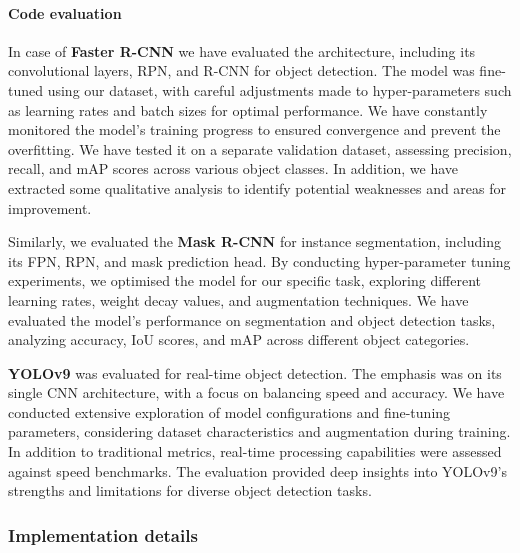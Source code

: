 \documentclass{IEEEtran}
\begin{document}
	\paragraph{Code evaluation}
	In case of  \textbf{Faster R-CNN} we have evaluated the architecture, including its convolutional layers, RPN, and R-CNN for object detection. The model was fine-tuned using our dataset, with careful adjustments made to hyper-parameters such as learning rates and batch sizes for optimal performance. We have constantly monitored the model's training progress to ensured convergence and prevent the overfitting. We have tested it on a separate validation dataset, assessing precision, recall, and mAP scores across various object classes. In addition, we have extracted some qualitative analysis to identify potential weaknesses and areas for improvement.
	
	Similarly, we evaluated the \textbf{Mask R-CNN} for instance segmentation, including its FPN, RPN, and mask prediction head. By conducting hyper-parameter tuning experiments, we optimised the model for our specific task, exploring different learning rates, weight decay values, and augmentation techniques. We have evaluated the model's performance on segmentation and object detection tasks, analyzing accuracy, IoU scores, and mAP across different object categories.
	
	\textbf{YOLOv9} was evaluated for real-time object detection. The emphasis was on its single CNN architecture, with a focus on balancing speed and accuracy. We have conducted extensive exploration of model configurations and fine-tuning parameters, considering dataset characteristics and augmentation during training. In addition to traditional metrics, real-time processing capabilities were assessed against speed benchmarks. The evaluation provided deep insights into YOLOv9's strengths and limitations for diverse object detection tasks.
	
	\subsubsection{Implementation details}
\end{document}
